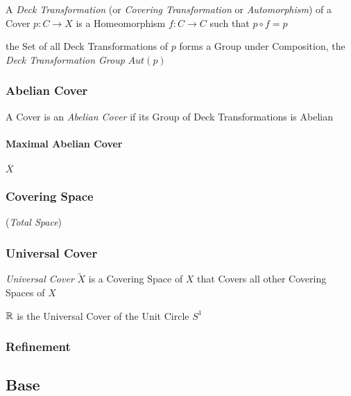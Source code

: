 A \emph{Deck Transformation} (or \emph{Covering Transformation} or
\emph{Automorphism}) of a Cover $p : C \rightarrow X$ is a
Homeomorphism $f : C \rightarrow C$ such that $p \circ f = p$

the Set of all Deck Transformations of $p$ forms a Group under
Composition, the \emph{Deck Transformation Group} $Aut(p)$



\subsubsection{Abelian Cover}\label{sec:abelian_cover}

A Cover is an \emph{Abelian Cover} if its Group of Deck
Transformations is Abelian



\paragraph{Maximal Abelian Cover}\label{sec:maximal_abelian_cover}\hfill

$\overline{X}$


\subsubsection{Covering Space}\label{sec:covering_space}

(\emph{Total Space})



\subsubsection{Universal Cover}\label{sec:universal_cover}\hfill

\emph{Universal Cover} $\tilde{X}$ is a Covering Space of $X$ that
Covers all other Covering Spaces of $X$

$\mathbb{R}$ is the Universal Cover of the Unit Circle $S^1$




\subsubsection{Refinement}\label{sec:refinement}



\subsection{Base}\label{sec:topological_base}

